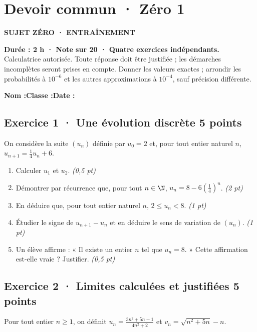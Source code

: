 \clearpage{}\label{sujet:3-1}

\section*{Devoir commun · Zéro 1}

{\sffamily\bfseries\color{teal}SUJET ZÉRO · ENTRAÎNEMENT\par}

\textbf{Durée : 2 h · Note sur 20 · Quatre exercices indépendants.}\\Calculatrice autorisée. Toute réponse doit être justifiée ; les démarches incomplètes seront prises en compte. Donner les valeurs exactes ; arrondir les probabilités à $10^{-6}$ et les autres approximations à $10^{-4}$, sauf précision différente.

\smallskip\textbf{Nom :}\enspace\dotfill\quad\textbf{Classe :}\enspace\dotfill\quad\textbf{Date :}\enspace\dotfill

\subsection*{Exercice 1 · Une évolution discrète \hfill 5 points}On considère la suite $(u_n)$ définie par $u_0=2$ et, pour tout entier naturel $n$, $u_{n+1}=\frac{1}{4}u_n+6$.

\begin{enumerate}

\item Calculer $u_1$ et $u_2$. \hfill\textit{(0,5 pt)}

\item Démontrer par récurrence que, pour tout $n\in\N$, $u_n=8-6\left(\frac{1}{4}\right)^n$. \hfill\textit{(2 pt)}

\item En déduire que, pour tout entier naturel $n$, $2\le u_n<8$. \hfill\textit{(1 pt)}

\item Étudier le signe de $u_{n+1}-u_n$ et en déduire le sens de variation de $(u_n)$. \hfill\textit{(1 pt)}

\item Un élève affirme : « Il existe un entier $n$ tel que $u_n=8$. » Cette affirmation est-elle vraie ? Justifier. \hfill\textit{(0,5 pt)}

\end{enumerate}

\subsection*{Exercice 2 · Limites calculées et justifiées \hfill 5 points}Pour tout entier $n\ge1$, on définit $u_n=\frac{3n^2+5n-1}{4n^2+2}$ et $v_n=\sqrt{n^2+5n}-n$.

